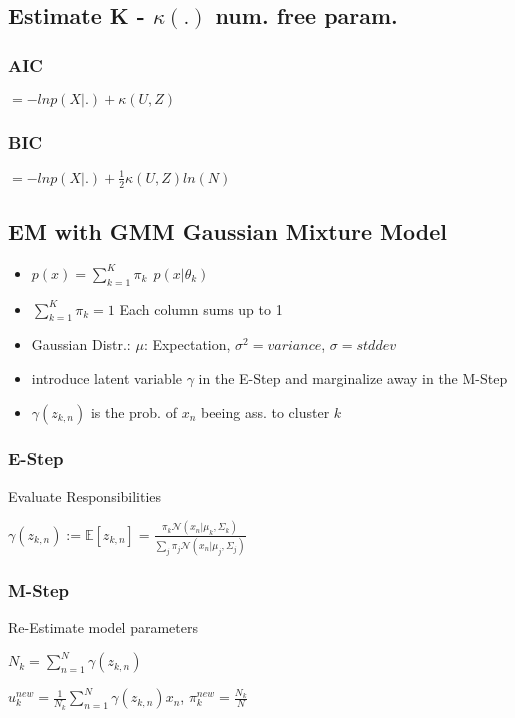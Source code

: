 \documentclass[11pt,twocolumn]{article}
\begin{document}
\subsection{Estimate K - $\kappa(.)$ num. free param.}
\subsubsection{AIC} 
$= - ln p(X|.) +\kappa(U,Z)$

\subsubsection{BIC} 
$= - ln p(X|.) + \frac{1}{2} \kappa(U,Z) ln(N)$

\subsection{EM with GMM Gaussian Mixture Model}
\begin{itemize}
\item $p(x) = \sum_{k=1}^{K}{\pi_k~~ p(x|\theta_k)}$
\item $\sum_{k=1}^K{\pi_k}=1$ Each column sums up to 1
\item Gaussian Distr.: $\mu$: Expectation, $\sigma^2 = variance$, $\sigma = stddev$

\item introduce latent variable $\gamma$ in the E-Step and marginalize away in the M-Step
\item $\gamma(z_{k,n})$ is the prob. of $x_n$ beeing ass. to cluster $k$

\end{itemize}

\subsubsection{E-Step} Evaluate Responsibilities

$\gamma(z_{k,n}):=\mathbb{E}[z_{k,n}] = \frac{\pi_k \mathcal{N}(x_n|\mu_k, \Sigma_k)}{\sum_j \pi_j \mathcal{N}(x_n|\mu_j, \Sigma_j)}$


\subsubsection{M-Step} Re-Estimate model parameters

$N_k = \sum_{n=1}^N{\gamma(z_{k,n})}$

$u_k^{new} = \frac{1}{N_k} \sum_{n=1}^N{\gamma(z_{k,n})x_n}$, $\pi_k^{new}= \frac{N_k}{N}$
\end{document}
